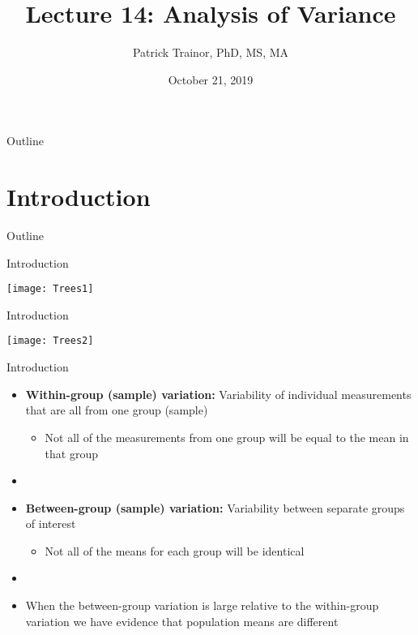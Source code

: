 \documentclass[xcolor=dvipsnames]{beamer}
\title[Lecture 14]{Lecture 14: Analysis of Variance}
\author[Patrick Trainor]{Patrick Trainor, PhD, MS, MA}
\institute[NMSU]{New Mexico State University}
\date{October 21, 2019}
\begin{document}
	
\begin{frame}
	\maketitle
\end{frame}

\begin{frame}{Outline}
	\tableofcontents[hideallsubsections]
\end{frame}

\section{Introduction}

\begin{frame}{Outline}
	\tableofcontents[currentsection,subsectionstyle=show/shaded/hide]
\end{frame}

\begin{frame}{Introduction}
	\begin{center}
		\texttt{[image: Trees1]}
	\end{center}
\end{frame}

\begin{frame}{Introduction}
	\begin{center}
		\texttt{[image: Trees2]}
	\end{center}
\end{frame}

\begin{frame}{Introduction}
	\begin{itemize}
		\item \textbf{Within-group (sample) variation:} Variability of individual measurements that are all from one group (sample) \pause
		\begin{itemize}
			\item Not all of the measurements from one group will be equal to the mean in that group \pause
		\end{itemize}
		\item[]
		\item \textbf{Between-group (sample) variation:} Variability between separate groups of interest \pause
		\begin{itemize}
			\item Not all of the means for each group will be identical \pause
		\end{itemize}
		\item[]
		\item When the between-group variation is large relative to the within-group variation we have evidence that population means are different 
	\end{itemize}
\end{frame}
\end{document}
